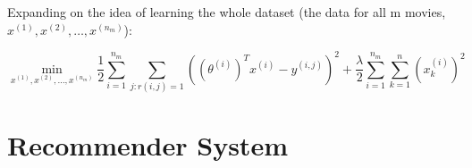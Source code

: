 \documentclass{scrartcl}
\begin{document}
Expanding on the idea of learning the whole dataset (the data for all
m movies, $x^{(1)},x^{(2)}, \dots,  x^{(n_m)}$):

\[ \min \limits_{x^{(1)},x^{(2)}, \dots,  x^{(n_m)}} \frac{1}{2} \sum
\limits_{i=1}^{n_m}  \sum \limits_{j:r(i, j) = 1}
((\theta^{(i)})^T x^{(i)} - y^{(i,j)})^2 + \frac{\lambda}{2} \sum
\limits_{i=1}^{n_m} \sum \limits_{k=1}^n (x_k^{(i)})^2 \]


\section{Recommender System}
\label{sec:16}
\end{document}
